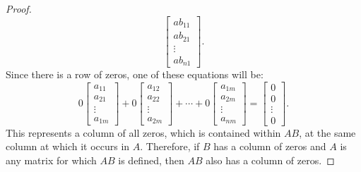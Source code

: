 \documentclass{article}
\begin{document}
\begin{enumerate}
{\begin{enumerate}
\begin{proof}
\[          \begin{bmatrix}ab_{11} \\ ab_{21} \\ \vdots \\ ab_{n1} \end{bmatrix}.
        \]
        Since there is a row of zeros, one of these equations will be:
        \[
          0\begin{bmatrix} a_{11} \\ a_{21} \\ \vdots \\ a_{1m}\end{bmatrix} +
          0\begin{bmatrix} a_{12} \\ a_{22} \\ \vdots \\ a_{2m}\end{bmatrix} + \cdots +
          0\begin{bmatrix} a_{1m} \\ a_{2m} \\ \vdots \\ a_{nm}\end{bmatrix} =
          \begin{bmatrix}0 \\ 0 \\ \vdots \\ 0 \end{bmatrix}.
        \]
        This represents a column of all zeros, which is contained within $AB$, at the same column at which it occurs in $A$. Therefore, if $B$ has a column of zeros and $A$ is any matrix for which $AB$ is defined, then $AB$ also has a column of zeros.
      \end{proof}
    \end{enumerate}}
\end{enumerate}
\end{document}
